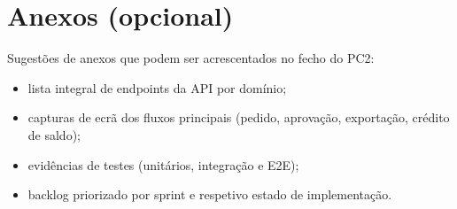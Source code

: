 \documentclass[11pt,a4paper]{article}
\begin{document}
\section*{Anexos (opcional)}
Sugestões de anexos que podem ser acrescentados no fecho do PC2:
\begin{itemize}
  \item lista integral de endpoints da API por domínio;
  \item capturas de ecrã dos fluxos principais (pedido, aprovação, exportação, crédito de saldo);
  \item evidências de testes (unitários, integração e E2E);
  \item backlog priorizado por sprint e respetivo estado de implementação.
\end{itemize}
\end{document}
